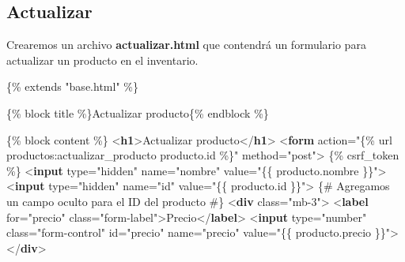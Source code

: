 \documentclass[
  a4paper,
  DIV=11,
  numbers=noendperiod,
  onepage,
  openany]{scrreprt}
\newenvironment{Shaded}{\begin{snugshade}}{\end{snugshade}}
\newcommand{\DataTypeTok}[1]{\textcolor[rgb]{0.68,0.00,0.00}{#1}}
\newcommand{\KeywordTok}[1]{\textcolor[rgb]{0.00,0.23,0.31}{\textbf{#1}}}
\newcommand{\NormalTok}[1]{\textcolor[rgb]{0.00,0.23,0.31}{#1}}
\newcommand{\OperatorTok}[1]{\textcolor[rgb]{0.37,0.37,0.37}{#1}}
\newcommand{\OtherTok}[1]{\textcolor[rgb]{0.00,0.23,0.31}{#1}}
\newcommand{\StringTok}[1]{\textcolor[rgb]{0.13,0.47,0.30}{#1}}
\begin{document}
\begin{tcolorbox}
\section{Actualizar}\label{actualizar}

Crearemos un archivo \textbf{actualizar.html} que contendrá un
formulario para actualizar un producto en el inventario.

\begin{Shaded}
\begin{Highlighting}[]
\NormalTok{\{\% extends "base.html" \%\}}

\NormalTok{\{\% block title \%\}Actualizar producto\{\% endblock \%\}}

\NormalTok{\{\% block content \%\}}
\DataTypeTok{\textless{}}\KeywordTok{h1}\DataTypeTok{\textgreater{}}\NormalTok{Actualizar producto}\DataTypeTok{\textless{}/}\KeywordTok{h1}\DataTypeTok{\textgreater{}}
\DataTypeTok{\textless{}}\KeywordTok{form}\OtherTok{ action}\OperatorTok{=}\StringTok{"\{\% url \textquotesingle{}productos:actualizar\_producto\textquotesingle{} producto.id \%\}"}\OtherTok{ method}\OperatorTok{=}\StringTok{"post"}\DataTypeTok{\textgreater{}}
\NormalTok{    \{\% csrf\_token \%\}}
    \DataTypeTok{\textless{}}\KeywordTok{input}\OtherTok{ type}\OperatorTok{=}\StringTok{"hidden"}\OtherTok{ name}\OperatorTok{=}\StringTok{"nombre"}\OtherTok{ value}\OperatorTok{=}\StringTok{"\{\{ producto.nombre \}\}"}\DataTypeTok{\textgreater{}}
    \DataTypeTok{\textless{}}\KeywordTok{input}\OtherTok{ type}\OperatorTok{=}\StringTok{"hidden"}\OtherTok{ name}\OperatorTok{=}\StringTok{"id"}\OtherTok{ value}\OperatorTok{=}\StringTok{"\{\{ producto.id \}\}"}\DataTypeTok{\textgreater{}}\NormalTok{ \{\# Agregamos un campo oculto para el ID del producto \#\}}
    \DataTypeTok{\textless{}}\KeywordTok{div}\OtherTok{ class}\OperatorTok{=}\StringTok{"mb{-}3"}\DataTypeTok{\textgreater{}}
        \DataTypeTok{\textless{}}\KeywordTok{label}\OtherTok{ for}\OperatorTok{=}\StringTok{"precio"}\OtherTok{ class}\OperatorTok{=}\StringTok{"form{-}label"}\DataTypeTok{\textgreater{}}\NormalTok{Precio}\DataTypeTok{\textless{}/}\KeywordTok{label}\DataTypeTok{\textgreater{}}
        \DataTypeTok{\textless{}}\KeywordTok{input}\OtherTok{ type}\OperatorTok{=}\StringTok{"number"}\OtherTok{ class}\OperatorTok{=}\StringTok{"form{-}control"}\OtherTok{ id}\OperatorTok{=}\StringTok{"precio"}\OtherTok{ name}\OperatorTok{=}\StringTok{"precio"}\OtherTok{ value}\OperatorTok{=}\StringTok{"\{\{ producto.precio \}\}"}\DataTypeTok{\textgreater{}}
    \DataTypeTok{\textless{}/}\KeywordTok{div}\DataTypeTok{\textgreater{}}

\end{Highlighting}
\end{Shaded}
\end{tcolorbox}
\end{document}
